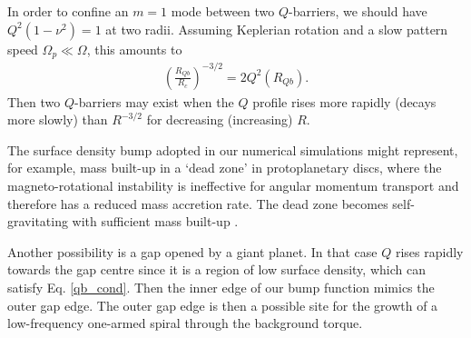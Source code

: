 {  In order to confine an $m=1$ mode between two $Q$-barriers, we
  should have $Q^2(1-\nu^2)=1$ at two radii. Assuming 
  Keplerian rotation and a slow pattern speed $\Omega_p\ll\Omega$,
  this amounts to 
  \begin{align}\label{qb_cond}
    \left(\frac{R_{Qb}}{R_c}\right)^{-3/2} = 2Q^2(R_{Qb}). 
  \end{align}
  Then two $Q$-barriers may exist when the $Q$ profile
  rises more rapidly (decays more slowly) than $R^{-3/2}$
  for decreasing (increasing) $R$. 
  
  The surface density bump adopted in our numerical simulations might
  represent, for example, mass built-up in a 
  `dead zone' in protoplanetary 
  discs, where the magneto-rotational 
  instability is ineffective for angular momentum transport
  \citep{gammie96,turner08,landry13} and therefore has a reduced mass
  accretion rate. The dead zone becomes 
  self-gravitating with sufficient mass built-up 
  \citep{armitage01,martin12,martin12b,zhu09,zhu10,zhu10b,bae13}.  

 
  


  
  Another possibility is a gap opened by a giant planet. In that case $Q$
  rises rapidly towards the gap centre since it is a region of low
  surface density, which can satisfy Eq. \ref{qb_cond}. Then the inner
  edge of our bump
  function mimics the outer gap edge. The outer gap edge is then a
  possible site for the growth of a low-frequency one-armed spiral
  through the background torque. 

}



